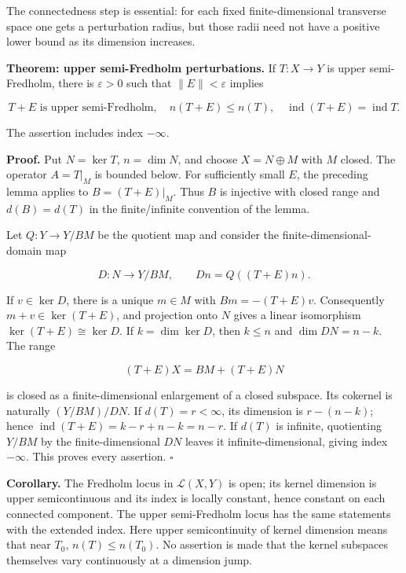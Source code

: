 \documentclass[
  11pt,
]{article}
\begin{document}
The connectedness step is essential: for each fixed finite-dimensional
transverse space one gets a perturbation radius, but those radii need
not have a positive lower bound as its dimension increases.

\textbf{Theorem: upper semi-Fredholm perturbations.} If \(T:X\to Y\) is
upper semi-Fredholm, there is \(\varepsilon>0\) such that
\(\|E\|<\varepsilon\) implies

\[
T+E\text{ is upper semi-Fredholm},\quad
n(T+E)\leq n(T),\quad
\operatorname{ind}(T+E)=\operatorname{ind}T.                    \tag{F6}
\]

The assertion includes index \(-\infty\).

\textbf{Proof.} Put \(N=\ker T\), \(n=\dim N\), and choose
\(X=N\oplus M\) with \(M\) closed. The operator \(A=T|_M\) is bounded
below. For sufficiently small \(E\), the preceding lemma applies to
\(B=(T+E)|_M\). Thus \(B\) is injective with closed range and
\(d(B)=d(T)\) in the finite/infinite convention of the lemma.

Let \(Q:Y\to Y/BM\) be the quotient map and consider the
finite-dimensional-domain map

\[
D:N\longrightarrow Y/BM,\qquad Dn=Q((T+E)n).                   \tag{F7}
\]

If \(v\in\ker D\), there is a unique \(m\in M\) with \(Bm=-(T+E)v\).
Consequently \(m+v\in\ker(T+E)\), and projection onto \(N\) gives a
linear isomorphism \(\ker(T+E)\cong\ker D\). If \(k=\dim\ker D\), then
\(k\leq n\) and \(\dim DN=n-k\). The range

\[
(T+E)X=BM+(T+E)N
\]

is closed as a finite-dimensional enlargement of a closed subspace. Its
cokernel is naturally \((Y/BM)/DN\). If \(d(T)=r<\infty\), its dimension
is \(r-(n-k)\); hence \(\operatorname{ind}(T+E)=k-r+n-k=n-r\). If
\(d(T)\) is infinite, quotienting \(Y/BM\) by the finite-dimensional
\(DN\) leaves it infinite-dimensional, giving index \(-\infty\). This
proves every assertion. \(\square\)

\textbf{Corollary.} The Fredholm locus in \(\mathcal L(X,Y)\) is open;
its kernel dimension is upper semicontinuous and its index is locally
constant, hence constant on each connected component. The upper
semi-Fredholm locus has the same statements with the extended index.
Here upper semicontinuity of kernel dimension means that near \(T_0\),
\(n(T)\leq n(T_0)\). No assertion is made that the kernel subspaces
themselves vary continuously at a dimension jump.
\end{document}
